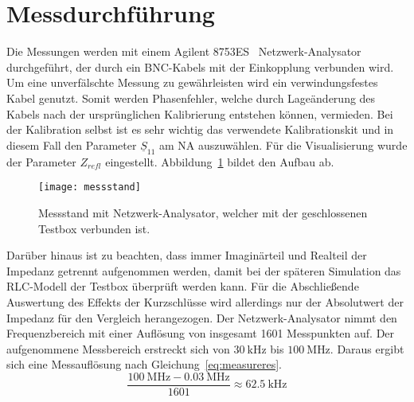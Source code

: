 \section{Messdurchf\"uhrung}
Die Messungen werden mit einem Agilent 8753ES~\citep{agilent2000} Netzwerk-Analysator durchgef\"uhrt, der durch ein BNC-Kabels mit der Einkopplung verbunden wird. Um eine unverf\"alschte Messung zu gew\"ahrleisten wird ein verwindungsfestes Kabel genutzt. Somit werden Phasenfehler, welche durch Lage\"anderung des Kabels nach der urspr\"unglichen Kalibrierung entstehen k\"onnen, vermieden. Bei der Kalibration selbst ist es sehr wichtig das verwendete Kalibrationskit und in diesem Fall den Parameter $\underline{S}_{11}$ am NA auszuw\"ahlen. F\"ur die Visualisierung wurde der Parameter $Z_{refl}$ eingestellt. Abbildung~\ref{fig:messstand} bildet den Aufbau ab.
\par
\begin{figure}[htb]
	\centering
	\texttt{[image: messstand]}
	\caption{Messstand mit Netzwerk-Analysator, welcher mit der geschlossenen Testbox verbunden ist.}
	\label{fig:messstand}
\end{figure}

Dar\"uber hinaus ist zu beachten, dass immer Imagin\"arteil und Realteil der Impedanz getrennt aufgenommen werden, damit bei der sp\"ateren Simulation das RLC-Modell der Testbox \"uberpr\"uft werden kann. F\"ur die Abschlie\ss{}ende Auswertung des Effekts der Kurzschl\"usse wird allerdings nur der Absolutwert der Impedanz f\"ur den Vergleich herangezogen. Der Netzwerk-Analysator nimmt den Frequenzbereich mit einer Aufl\"osung von insgesamt 1601 Messpunkten auf. Der aufgenommene Messbereich erstreckt sich von $\SI{30}{\kilo\hertz}$ bis $\SI{100}{\mega\hertz}$. Daraus ergibt sich eine Messaufl\"osung nach Gleichung~\ref{eq:measureres}.
\begin{equation}
	\frac{\SI{100}{\mega\hertz} - \SI{0,03}{\mega\hertz} }{1601} \approx \SI{62,5}{\kilo\hertz} 
	\label{eq:measureres}
\end{equation}


